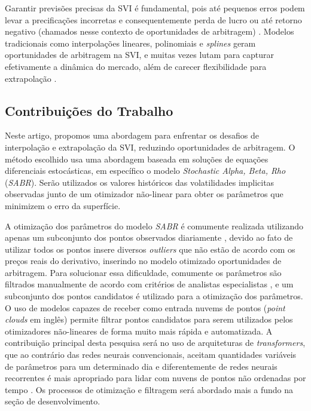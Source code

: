 Garantir previsões precisas da SVI é fundamental, pois até pequenos erros podem levar a precificações incorretas e consequentemente perda de lucro ou até retorno negativo (chamados nesse contexto de oportunidades de arbitragem) \citep{Hagan2014}. Modelos tradicionais como interpolações lineares, polinomiais e \textit{splines} geram oportunidades de arbitragem na SVI, e muitas vezes lutam para capturar efetivamente a dinâmica do mercado, além de carecer flexibilidade para extrapolação \citep{Hagan2014}.

\subsection{Contribuições do Trabalho}

Neste artigo, propomos uma abordagem para enfrentar os desafios de interpolação e extrapolação da SVI, reduzindo oportunidades de arbitragem. O método escolhido usa uma abordagem baseada em soluções de equações diferenciais estocásticas, em específico o modelo \textit{Stochastic Alpha, Beta, Rho} (\textit{SABR}). Serão utilizados os valores históricos das volatilidades implicitas observadas junto de um otimizador não-linear para obter os parâmetros que minimizem o erro da superfície.

A otimização dos parâmetros do modelo \textit{SABR} é comumente realizada utilizando apenas um subconjunto dos pontos observados diariamente \citep{Kim2021}, devido ao fato de utilizar todos os pontos insere diversos \textit{outliers} que não estão de acordo com os preços reais do derivativo, inserindo no modelo otimizado oportunidades de arbitragem. Para solucionar essa dificuldade, comumente os parâmetros são filtrados manualmente de acordo com critérios de analistas especialistas \citep{Hagan2002}, e um subconjunto dos pontos candidatos é utilizado para a otimização dos parâmetros. O uso de modelos capazes de receber como entrada nuvems de pontos (\textit{point clouds} em inglês) permite filtrar pontos candidatos para serem utilizados pelos otimizadores não-lineares de forma muito mais rápida e automatizada. A contribuição principal desta pesquisa será no uso de arquiteturas de \textit{transformers}, que ao contrário das redes neurais convencionais, aceitam quantidades variáveis de parâmetros para um determinado dia e diferentemente de redes neurais recorrentes é mais apropriado para lidar com nuvens de pontos não ordenadas por tempo \citep{Kim2024}. Os processos de otimização e filtragem será abordado mais a fundo na seção de desenvolvimento.

